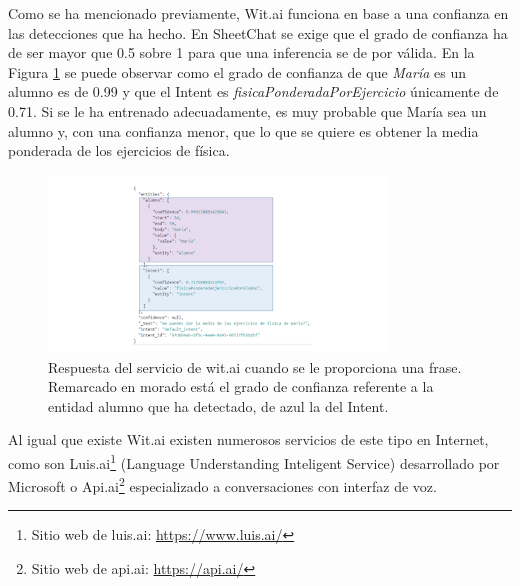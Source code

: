 Como se ha mencionado previamente, Wit.ai funciona en base a una confianza en las detecciones que ha hecho. En SheetChat se exige que el grado de confianza ha de ser mayor que 0.5 sobre 1 para que una inferencia se de por válida. En la Figura \ref{fig:WitaiConfianza} se puede observar como el grado de confianza de que \emph{María} es un alumno es de 0.99 y que el Intent es \emph{fisicaPonderadaPorEjercicio} únicamente de 0.71. Si se le ha entrenado adecuadamente, es muy probable que María sea un alumno y, con una confianza menor, que lo que se quiere es obtener la media ponderada de los ejercicios de física.

\begin{figure}[htb]
	\centering
	\includegraphics[width=0.8\textwidth]{./figs/WitaiConfianza.png}
	\caption{Respuesta del servicio de wit.ai cuando se le proporciona una frase. Remarcado en morado está el grado de confianza referente a la entidad alumno que ha detectado, de azul la del Intent.}
	\label{fig:WitaiConfianza}
\end{figure}

Al igual que existe Wit.ai existen numerosos servicios de este tipo en Internet, como son Luis.ai\footnote{Sitio web de luis.ai: \url{https://www.luis.ai/}} (Language Understanding Inteligent Service) desarrollado por Microsoft o Api.ai\footnote{Sitio web de api.ai: \url{https://api.ai/}} especializado a conversaciones con interfaz de voz.


























